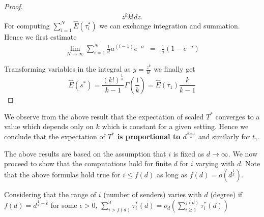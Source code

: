 \begin{proof}
\begin{eqnarray}
{{z^{k}}{k!}}dz .
\end{eqnarray}%
For computing $\mathop{\displaystyle \sum }\limits_{i=1}^{N}\hat E\left(
\tau _{i}^{\ast }\right) $ we can exchange integration and summation. Hence
we first estimate 
\begin{equation}
\begin{aligned} \lim_{N\rightarrow \infty }\mathop{\displaystyle \sum
}\limits_{i=1}^{N}\frac{1}{ i !}a^{\left( i-1\right) }e^{-a}
&=&\frac{1}{a}\left(
1-e^{-a}\right)
\end{aligned}
\end{equation}

Transforming variables in the integral as $y=\frac{z^{k}}{k!}$ we
finally get 
\begin{equation}
\hat E \left( s^{\ast }\right) =\frac{\left( k!\right) ^{\frac{1}{k}}}{k-1%
}\Gamma \left( \frac{1}{k}\right)= \hat E(\tau_1)\frac{k}{k-1}
\end{equation}

\end{proof}

We observe from the above result that the expectation of scaled $T^{*}$ converges to a value which depends only on $k$ which is constant for a given setting. 
Hence we conclude that the expectation of {\bf $T^{*}$ is proportional to $d^{\frac{k-1}{k}}$} and similarly for $t_1$.

The above results are based on the assumption that $i$ is fixed as  
$d\rightarrow \infty .$  
We now proceed to show that the computations hold for finite $d$ for $i$ varying with $d$.
Note that the above formulas hold true for $i\leq f\left( d\right) $ as
long as $f\left( d\right) =o\left( d^{\frac{1}{k}}\right) .$ 


\begin{theorem}
\label{theorem-3}
Considering that the range of $i$ (number of senders) varies with $d$ (degree) if $f\left( d\right) =d^{\frac{1}{k}-\epsilon }$
for some $\epsilon >0$, %
$\sum_{i>f\left( d\right) }^{d}\tau _{i}^{\ast }\left( d\right) =o_{d}\left(
\sum_{i\geq 1}^{f\left( d\right) }\tau _{i}^{\ast }\left( d\right) \right) $
\end{theorem}

